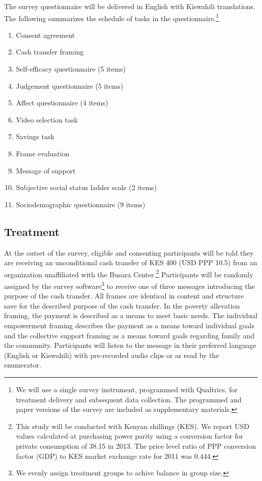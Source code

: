 \documentclass[11pt, a4paper]{article}\usepackage[]{graphicx}\usepackage[]{color}
\begin{document}
        The survey questionnaire will be delivered in English with Kiswahili translations. The following summarizes the schedule of tasks in the questionnaire.\footnote{We will use a single survey instrument, programmed with Qualtrics, for treatment delivery and subsequent data collection. The programmed and paper versions of the survey are included as supplementary materials.}

        \begin{enumerate}
            \item Consent agreement
            \item Cash transfer framing
            \item Self-efficacy questionnaire (5 items)
            \item Judgement questionnaire (5 items)
            \item Affect questionnaire (4 items)
            \item Video selection task
            \item Savings task
            \item Frame evaluation
            \item Message of support
            \item Subjective social status ladder scale (2 items)
            \item Sociodemographic questionnaire (9 items)
        \end{enumerate}

    \subsection{Treatment}

        At the outset of the survey, eligible and consenting participants will be told they are receiving an unconditional cash transfer of KES 400 (USD PPP 10.5) from an organization unaffiliated with the Busara Center.\footnote{This study will be conducted with Kenyan shillings (KES). We report USD values calculated at purchasing power parity using a conversion factor for private consumption of 38.15 in 2013. The price level ratio of PPP conversion factor (GDP) to KES market exchange rate for 2011 was 0.444.} Participants will be randomly assigned by the survey software\footnote{We evenly assign treatment groups to achive balance in group size.} to receive one of three messages introducing the purpose of the cash transfer. All frames are identical in content and structure save for the described purpose of the cash transfer. In the poverty allevation framing, the payment is described as a means to meet basic needs. The individual empowerment framing describes the payment as a means toward individual goals and the collective support framing as a means toward goals regarding family and the community. Participants will listen to the message in their preferred language (English or Kiswahili) with pre-recorded audio clips or as read by the enumerator.
\end{document}
